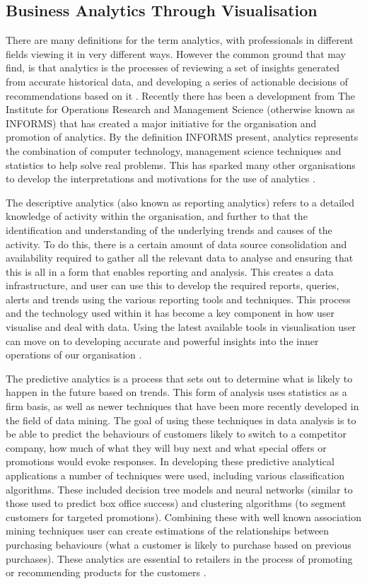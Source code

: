 \subsection{Business Analytics Through Visualisation}

There are many definitions for the term analytics, with professionals in different fields viewing it in very different ways. However the common ground that may find, is that analytics is the processes of reviewing a set of insights generated from accurate historical data, and developing a series of actionable decisions of recommendations based on it \cite{melpignano2012platform}. Recently there has been a development from The Institute for Operations Research and Management Science (otherwise known as INFORMS) that has created a major initiative for the organisation and promotion of analytics. By the definition INFORMS present, analytics represents the combination of computer technology, management science techniques and statistics to help solve real problems. This has sparked many other organisations to develop the interpretations and motivations for the use of analytics \cite{keim2008visual}.

The descriptive analytics (also known as reporting analytics) refers to a detailed knowledge of activity within the organisation, and further to that the identification and understanding of the underlying trends and causes of the activity. To do this, there is a certain amount of data source consolidation and availability required to gather all the relevant data to analyse and ensuring that this is all in a form that enables reporting and analysis. This creates a data infrastructure, and user can use this to develop the required reports, queries, alerts and trends using the various reporting tools and techniques. This process and the technology used within it has become a key component in how user visualise and deal with data. Using the latest available tools in visualisation user can move on to developing accurate and powerful insights into the inner operations of our organisation \cite{haas2011data}. 

The predictive analytics is a process that sets out to determine what is likely to happen in the future based on trends. This form of analysis uses statistics as a firm basis, as well as newer techniques that have been more recently developed in the field of data mining. The goal of using these techniques in data analysis is to be able to predict the behaviours of customers likely to switch to a competitor company, how much of what they will buy next and what special offers or promotions would evoke responses. In developing these predictive analytical applications a number of techniques were used, including various classification algorithms. These included decision tree models and neural networks (similar to those used to predict box office success) and clustering algorithms (to segment customers for targeted promotions). Combining these with well known association mining techniques user can create estimations of the relationships between purchasing behaviours (what a customer is likely to purchase based on previous purchases). These analytics are essential to retailers in the process of promoting or recommending products for the customers \cite{shmueli2011predictive}. 

